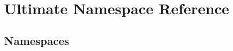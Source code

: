 \hypertarget{namespace_ultimate}{}\section{Ultimate Namespace Reference}
\label{namespace_ultimate}
\subsection*{Namespaces}
\begin{DoxyCompactItemize}
\end{DoxyCompactItemize}

